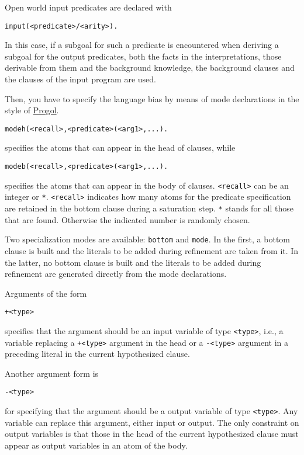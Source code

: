 Open world input predicates are declared with
\begin{verbatim}
input(<predicate>/<arity>).
\end{verbatim}
In this case, if a subgoal for such a predicate is encountered when deriving a subgoal for the output predicates, 
both the facts in the interpretations, those derivable from them and the background knowledge, the background clauses and the clauses of the input program are used.

Then, you have to specify the language bias by means of mode declarations in the style of 
\href{http://www.doc.ic.ac.uk/\string ~shm/progol.html}{Progol}.
\begin{verbatim}
modeh(<recall>,<predicate>(<arg1>,...).
\end{verbatim}
specifies the atoms that can appear in the head of clauses, while
\begin{verbatim}
modeb(<recall>,<predicate>(<arg1>,...).
\end{verbatim}
specifies the atoms that can appear in the body of clauses.
\texttt{<recall>} can be an integer or \texttt{*}.
\texttt{<recall>} indicates how many atoms for the predicate specification are
retained in the bottom clause during a saturation step. \texttt{*} stands for all those that are found. Otherwise the indicated number is randomly chosen.

Two specialization modes are available: \verb|bottom| and \verb|mode|.
In the first, a bottom clause is built and the literals to be added during 
refinement are taken from it. In the latter, no bottom clause is built and
the literals to be added during refinement are generated 
directly from the mode declarations. 

Arguments of the form
\begin{verbatim}
+<type>
\end{verbatim}
specifies that the argument should be an input variable of type \texttt{<type>}, i.e., a variable replacing a \texttt{+<type>} argument in the head or a \texttt{-<type>} argument in a preceding literal in the current hypothesized clause.

Another argument form is
\begin{verbatim}
-<type>
\end{verbatim}
for specifying that the argument should be a output variable of type \texttt{<type>}. 
Any variable can replace this argument, either input or output.
The only constraint on output variables is that those in the head of the current hypothesized 
clause must appear as output variables in an atom of the body.

